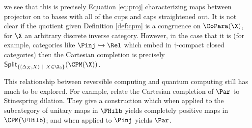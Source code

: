 we see that this is precisely Equation \ref{eq:proj} characterizing maps between projector on to bases with all of the cups and caps straightened out.  It is not clear if the quotient given Definition \ref{def:cpm} is a congruence on $\CoPara(\X)$, for $\X$ an arbitrary discrete inverse category.  However, in the case that it is (for example, categories like $\Pinj\hookrightarrow\Rel$ which embed in $\dag$-compact closed categories) then the Cartesian completion is precisely  ${\sf Split}_{\{(\Delta_X,X)\ | \ X \in \X_0 \}}(\CPM(\X))$.


This relationship between reversible computing and quantum computing still has much to be explored.  For example, \cite{Kaarsgaard} relate the Cartesian completion of $\Par$ to Stinespring dilation. They give a construction which when applied to the subcategory of unitary maps in $\FHilb$  yields completely positive maps in $\CPM(\FHilb)$; and when applied to $\Pinj$ yields $\Par$.
